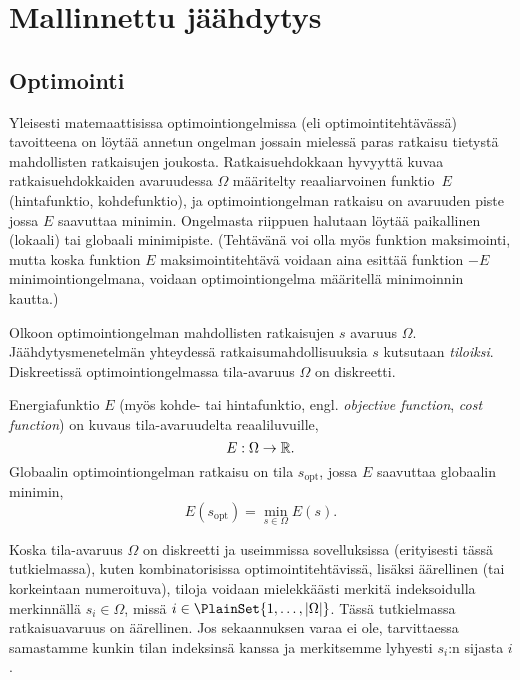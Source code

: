 \chapter{Mallinnettu jäähdytys}
\label{cha:simulated_annealing_algoritmi}

\section{Optimointi}
\label{sec:optimointi}

Yleisesti matemaattisissa optimointiongelmissa (eli optimointitehtävässä) tavoitteena on löytää annetun ongelman jossain mielessä paras ratkaisu tietystä mahdollisten ratkaisujen joukosta.
Ratkaisuehdokkaan hyvyyttä kuvaa ratkaisuehdokkaiden avaruudessa $\Omega$ määritelty reaaliarvoinen funktio~$E$ (hintafunktio, kohdefunktio),
ja optimointiongelman ratkaisu on avaruuden piste jossa $E$ saavuttaa minimin.
Ongelmasta riippuen halutaan löytää paikallinen (lokaali) tai globaali minimipiste.
(Tehtävänä voi olla myös funktion maksimointi,
mutta koska funktion $E$ maksimointitehtävä voidaan aina esittää funktion $-E$ minimointiongelmana,
voidaan optimointiongelma määritellä minimoinnin kautta.)

\begin{maar}
    \label{maar:globaali_optimointiongelma}
    Olkoon optimointiongelman mahdollisten ratkaisujen $s$ avaruus $\Omega$.
    Jäähdytysmenetelmän yhteydessä ratkaisumahdollisuuksia $s$ kutsutaan \emph{tiloiksi}.
    Diskreetissä optimointiongelmassa tila-avaruus $\Omega$ on diskreetti.

    Energiafunktio $E$ (myös kohde- tai hintafunktio, engl. \emph{objective function}, \emph{cost function}) on kuvaus tila-avaruudelta reaaliluvuille,
    \begin{equation}
        E: \Omega \to \mathbb{R}.
    \end{equation}
    Globaalin optimointiongelman ratkaisu on tila $s_\text{opt}$, jossa $E$ saavuttaa globaalin minimin,
    \begin{equation}
        \label{eq:energiafunktion_minimi}
        E(s_\text{opt}) = \min_{s\in\Omega} E(s).
    \end{equation}
\end{maar}

\begin{merk}
    Koska tila-avaruus $\Omega$ on diskreetti ja useimmissa sovelluksissa (erityisesti tässä tutkielmassa),
    kuten kombinatorisissa optimointitehtävissä, lisäksi äärellinen (tai korkeintaan numeroituva),
    tiloja voidaan mielekkäästi merkitä indeksoidulla merkinnällä $s_i \in \Omega$,
    missä $i \in \PlainSet{1, \dots, \abs{\Omega}}$.
    Tässä tutkielmassa ratkaisuavaruus on äärellinen.
    Jos sekaannuksen varaa ei ole, tarvittaessa samastamme kunkin tilan indeksinsä kanssa ja merkitsemme lyhyesti $s_i$:n sijasta $i$.
\end{merk}

